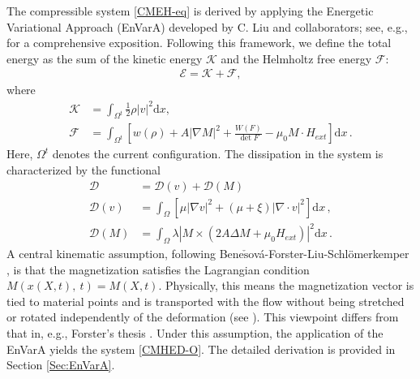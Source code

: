 \documentclass[reqno,11pt]{amsart}
\numberwithin{equation}{section}
\def\d{\mathrm{d}}
\def\no{\nonumber}
\begin{document}
The compressible system \eqref{CMEH-eq} is derived by applying the Energetic Variational Approach (EnVarA) developed by C. Liu and collaborators; see, e.g., \cite{GKL-18notes,WL-22entropy} for a comprehensive exposition. Following this framework, we define the total energy as the sum of the kinetic energy $\mathcal{K}$ and the Helmholtz free energy $\mathcal{F}$: 
\begin{align}
  \mathcal{E} = \mathcal{K} + \mathcal{F}, 
\end{align}
where 
\begin{align}
  \label{Def-K}\mathcal{K} & = \int_{\Omega^t} \tfrac{1}{2} \rho |v|^2 \d x, \\
  \label{Def-F} \mathcal{F} & = \int_{\Omega^t} \left[ w(\rho) + A|\nabla M|^2 + \frac{W(F)}{\det F} - \mu_0 M \cdot H_{ext} \right] \d x \,. 
\end{align}
Here, $\Omega^t$ denotes the current configuration. The dissipation in the system is characterized by the functional
\begin{align}\label{eq:dissipation-u-M}
  \no \mathcal{D} & = \mathcal{D}(v) + \mathcal{D}(M) \\
  \mathcal{D}(v) & = \int_{\Omega} \left[ \mu |\nabla v|^2 + (\mu + \xi) |\nabla \cdot v|^2 \right]  \d x \,, \\
   \no \mathcal{D}(M) & = \int_{\Omega} \lambda |M \times (2 A \Delta M + \mu_0 H_{ext})|^2 \d x \,.  
\end{align}
A central kinematic assumption, following Bene$\check{\mathrm{s}}$ov\'{a}-Forster-Liu-Schl\"{o}merkemper \cite{BFLS-2018-SIAM}, is that the magnetization satisfies the Lagrangian condition $M(x(X,t),\ t) = M(X,t)$. Physically,  this means the magnetization vector is tied to material points and is transported with the flow without being stretched or rotated independently of the deformation (see \cite[Remark 2.1]{BFLS-2018-SIAM}). This viewpoint differs from that in, e.g., Forster's thesis \cite{Forster-16thesis}. Under this assumption, the application of the EnVarA yields the system \eqref{CMHED-O}. The detailed derivation is provided in Section \ref{Sec:EnVarA}.
\end{document}
